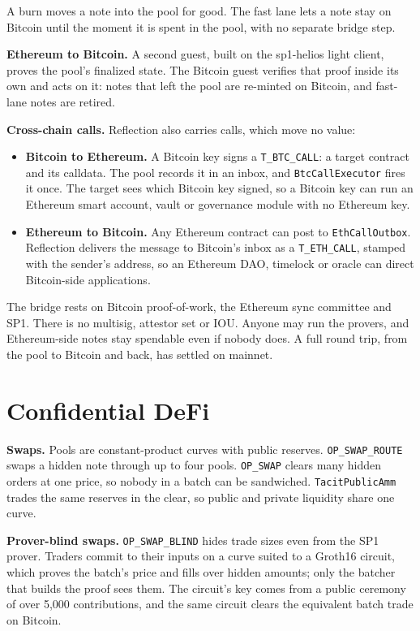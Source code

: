 \documentclass[11pt,letterpaper]{article}
\newcommand{\op}[1]{\texttt{#1}}
\begin{document}
A burn moves a note into the pool for good. The fast lane lets a note stay on Bitcoin until the moment
it is spent in the pool, with no separate bridge step.

\textbf{Ethereum to Bitcoin.} A second guest, built on the sp1-helios light client, proves the pool's
finalized state. The Bitcoin guest verifies that proof inside its own and acts on it: notes that left the
pool are re-minted on Bitcoin, and fast-lane notes are retired.

\textbf{Cross-chain calls.} Reflection also carries calls, which move no value:

\begin{itemize}
\item \textbf{Bitcoin to Ethereum.} A Bitcoin key signs a \op{T\_BTC\_\allowbreak{}CALL}: a target contract and its calldata. The
  pool records it in an inbox, and \op{BtcCallExecutor} fires it once. The target sees which Bitcoin key
  signed, so a Bitcoin key can run an Ethereum smart account, vault or governance module with no
  Ethereum key.
\item \textbf{Ethereum to Bitcoin.} Any Ethereum contract can post to \op{EthCallOutbox}. Reflection delivers the
  message to Bitcoin's inbox as a \op{T\_ETH\_\allowbreak{}CALL}, stamped with the sender's address, so an Ethereum DAO,
  timelock or oracle can direct Bitcoin-side applications.
\end{itemize}

The bridge rests on Bitcoin proof-of-work, the Ethereum sync committee and SP1. There is no multisig,
attestor set or IOU. Anyone may run the provers, and Ethereum-side notes stay spendable even if nobody
does. A full round trip, from the pool to Bitcoin and back, has settled on mainnet.

\section{Confidential DeFi}

\textbf{Swaps.} Pools are constant-product curves with public reserves. \op{OP\_SWAP\_\allowbreak{}ROUTE} swaps a hidden note
through up to four pools. \op{OP\_SWAP} clears many hidden orders at one price, so nobody in a batch can be
sandwiched. \op{TacitPublicAmm} trades the same reserves in the clear, so public and private liquidity share
one curve.

\textbf{Prover-blind swaps.} \op{OP\_SWAP\_\allowbreak{}BLIND} hides trade sizes even from the SP1 prover. Traders commit to
their inputs on a curve suited to a Groth16 circuit, which proves the batch's price and fills over hidden
amounts; only the batcher that builds the proof sees them. The circuit's key comes from a public ceremony of over 5,000 contributions, and the same circuit clears
the equivalent batch trade on Bitcoin.
\end{document}
